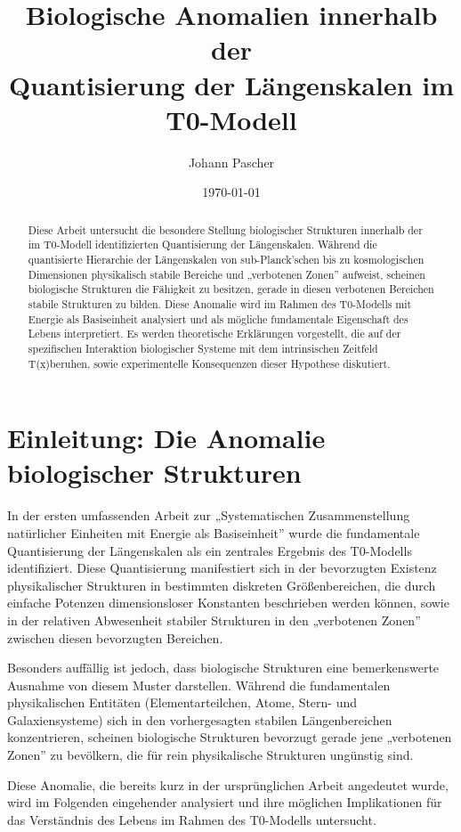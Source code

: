\documentclass[12pt,a4paper]{article}
\title{Biologische Anomalien innerhalb der\\Quantisierung der Längenskalen im T0-Modell}
\author{Johann Pascher}
\date{\today}
\newcommand{\Tfield}{T(x)}
\begin{document}
	
	\maketitle
	
	\begin{abstract}
		Diese Arbeit untersucht die besondere Stellung biologischer Strukturen innerhalb der im T0-Modell identifizierten Quantisierung der Längenskalen. Während die quantisierte Hierarchie der Längenskalen von sub-Planck'schen bis zu kosmologischen Dimensionen physikalisch stabile Bereiche und „verbotenen Zonen'' aufweist, scheinen biologische Strukturen die Fähigkeit zu besitzen, gerade in diesen verbotenen Bereichen stabile Strukturen zu bilden. Diese Anomalie wird im Rahmen des T0-Modells mit Energie als Basiseinheit analysiert und als mögliche fundamentale Eigenschaft des Lebens interpretiert. Es werden theoretische Erklärungen vorgestellt, die auf der spezifischen Interaktion biologischer Systeme mit dem intrinsischen Zeitfeld \Tfield beruhen, sowie experimentelle Konsequenzen dieser Hypothese diskutiert.
	\end{abstract}
	
	\section{Einleitung: Die Anomalie biologischer Strukturen}
	
	In der ersten umfassenden Arbeit zur „Systematischen Zusammenstellung natürlicher Einheiten mit Energie als Basiseinheit'' \cite{pascher_nateinheiten_2025} wurde die fundamentale Quantisierung der Längenskalen als ein zentrales Ergebnis des T0-Modells identifiziert. Diese Quantisierung manifestiert sich in der bevorzugten Existenz physikalischer Strukturen in bestimmten diskreten Größenbereichen, die durch einfache Potenzen dimensionsloser Konstanten beschrieben werden können, sowie in der relativen Abwesenheit stabiler Strukturen in den „verbotenen Zonen'' zwischen diesen bevorzugten Bereichen.
	
	Besonders auffällig ist jedoch, dass biologische Strukturen eine bemerkenswerte Ausnahme von diesem Muster darstellen. Während die fundamentalen physikalischen Entitäten (Elementarteilchen, Atome, Stern- und Galaxiensysteme) sich in den vorhergesagten stabilen Längenbereichen konzentrieren, scheinen biologische Strukturen bevorzugt gerade jene „verbotenen Zonen'' zu bevölkern, die für rein physikalische Strukturen ungünstig sind.
	
	Diese Anomalie, die bereits kurz in der ursprünglichen Arbeit angedeutet wurde, wird im Folgenden eingehender analysiert und ihre möglichen Implikationen für das Verständnis des Lebens im Rahmen des T0-Modells untersucht.
	
\end{document}
